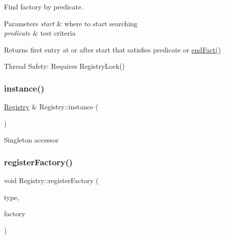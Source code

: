 Find factory by predicate. 
\begin{DoxyParams}{Parameters}
{\em start} & where to start searching \\
\hline
{\em predicate} & test criteria \\
\hline
\end{DoxyParams}
\begin{DoxyReturn}{Returns}
first entry at or after start that satisfies predicate or \hyperlink{classtheoria_1_1core_1_1Registry_ac88948c696663ae6f7ba3ece5c2fdcc9}{end\+Fact()}
\end{DoxyReturn}
Thread Safety\+: Requires Registry\+Lock() \mbox{\label{classtheoria_1_1core_1_1Registry_ac36dbf9ae74e19b9fe30f57910e3d93a}} 
\subsubsection{\texorpdfstring{instance()}{instance()}}
{\footnotesize\ttfamily \hyperlink{classtheoria_1_1core_1_1Registry}{Registry} \& Registry\+::instance (\begin{DoxyParamCaption}{ }\end{DoxyParamCaption})\hspace{0.3cm}{\ttfamily [static]}}

Singleton accessor \mbox{\label{classtheoria_1_1core_1_1Registry_ac7cd0cefa7207f2f6c602723cc32ee49}} 
\subsubsection{\texorpdfstring{register\+Factory()}{registerFactory()}\hspace{0.1cm}{\footnotesize\ttfamily [1/2]}}
{\footnotesize\ttfamily void Registry\+::register\+Factory (\begin{DoxyParamCaption}\item[{const Type\+Name \&}]{type,  }\item[{Component\+Factory}]{factory }\end{DoxyParamCaption})}

